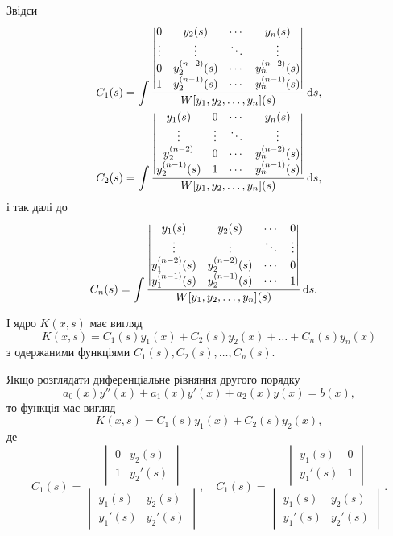 Звідси
\begin{align*}
	C_1(s) &= \int \frac{\begin{vmatrix} 0 & y_2(s) & \cdots & y_n(s) \\ \vdots & \vdots & \ddots & \vdots \\ 0 & y_2^{(n - 2)}(s) & \cdots & y_n^{(n - 2)}(s) \\ 1 & y_2^{(n - 1)}(s) & \cdots & y_n^{(n - 1)}(s) \end{vmatrix}}{W[y_1, y_2, \ldots, y_n](s)} \mathop{}\!\mathrm{d} s, \\
	C_2(s) &= \int \frac{\begin{vmatrix} y_1(s) & 0 & \cdots & y_n(s) \\ \vdots & \vdots & \ddots & \vdots \\ y_2^{(n - 2)} & 0 & \cdots & y_n^{(n - 2)}(s) \\ y_2^{(n - 1)}(s) & 1 & \cdots & y_n^{(n - 1)}(s) \end{vmatrix}}{W[y_1, y_2, \ldots, y_n](s)} \mathop{}\!\mathrm{d} s,
\end{align*}
і так далі до
\begin{align*}
	C_n(s) &= \int \frac{\begin{vmatrix} y_1(s) & y_2(s) & \cdots & 0 \\ \vdots & \vdots & \ddots & \vdots \\ y_1^{(n - 2)}(s) & y_2^{(n - 2)}(s) & \cdots & 0 \\ y_1^{(n - 1)}(s) & y_2^{(n - 1)}(s) & \cdots & 1 \end{vmatrix}}{W[y_1, y_2, \ldots, y_n](s)} \mathop{}\!\mathrm{d} s.
\end{align*}
 
І ядро $K(x, s)$ має вигляд
\begin{equation*}
	K(x, s) = C_1(s) y_1(x) + C_2(s) y_2(x) + \ldots + C_n(s) y_n(x)
\end{equation*}
з одержаними функціями $C_1(s), C_2(s), \ldots, C_n(s)$. \parvskip

Якщо розглядати диференціальне рівняння другого порядку 
\begin{equation*}
	a_0(x) y''(x) + a_1(x) y'(x) + a_2(x) y(x) = b(x),
\end{equation*}
то функція  має вигляд
\begin{equation*}
	K(x, s) = C_1(s) y_1(x) + C_2(s) y_2(x),
\end{equation*}
де
\begin{equation*}
	C_1(s) = \frac{\begin{vmatrix} 0 & y_2(s) \\ 1 & y_2'(s) \end{vmatrix}}{\begin{vmatrix} y_1(s) & y_2(s) \\ y_1'(s) & y_2'(s) \end{vmatrix}}, \quad C_1(s) = \frac{\begin{vmatrix} y_1(s) & 0 \\ y_1'(s) & 1 \end{vmatrix}}{\begin{vmatrix} y_1(s) & y_2(s) \\ y_1'(s) & y_2'(s) \end{vmatrix}}.
\end{equation*}

